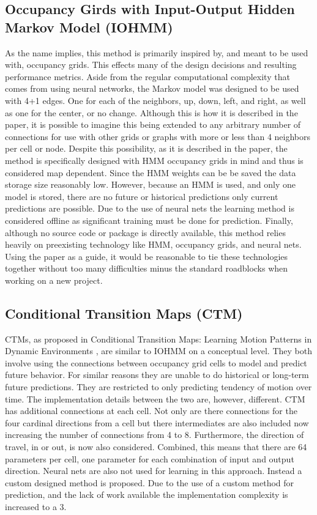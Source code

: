   \subsection { Occupancy Girds with Input-Output Hidden Markov Model (IOHMM) }
  As the name implies, this method is primarily inspired by, and meant to be
  used with, occupancy grids. This effects many of the design decisions and
  resulting performance metrics. Aside from the regular computational complexity
  that comes from using neural networks, the Markov model was designed to be
  used with 4+1 edges. One for each of the neighbors, up, down, left, and right,
  as well as one for the center, or no change. Although this is how it is
  described in the paper, it is possible to imagine this being extended to any
  arbitrary number of connections for use with other grids or graphs with more
  or less than 4 neighbors per cell or node. Despite this possibility, as it is
  described in the paper, the method is specifically designed with HMM occupancy
  grids in mind and thus is considered map dependent. Since the HMM weights can be
  be saved the data storage size reasonably low. However, because an HMM is used,
  and only one model is stored, there are no future or historical predictions
  only current predictions are possible. Due to the use of neural nets
  the learning method is considered offline as significant training must be
  done for prediction. Finally, although no source code or package is directly
  available, this method relies heavily on preexisting technology like HMM,
  occupancy grids, and neural nets. Using the paper as a guide, it would be
  reasonable to tie these technologies together without too many difficulties
  minus the standard roadblocks when working on a new project.

  \subsection { Conditional Transition Maps (CTM) }
  CTMs, as proposed in Conditional Transition Maps: Learning Motion Patterns
  in Dynamic Environments \cite{Kucner2013}, are similar to IOHMM on a conceptual
  level. They both involve using the connections between occupancy grid cells
  to model and predict future behavior. For similar reasons they are unable to
  do historical or long-term future predictions. They are restricted to only
  predicting tendency of motion over time. The implementation details between
  the two are, however, different. CTM has additional connections at each cell.
  Not only are there connections for the four cardinal directions from a cell
  but there intermediates are also included now increasing the number of connections
  from 4 to 8. Furthermore, the direction of travel, in or out, is now also
  considered. Combined, this means that there are 64 parameters per cell, one
  parameter for each combination of input and output direction. Neural nets
  are also not used for learning in this approach. Instead a custom designed
  method is proposed. Due to the use of a custom method for prediction, and
  the lack of work available the implementation complexity is increased to a 3.

